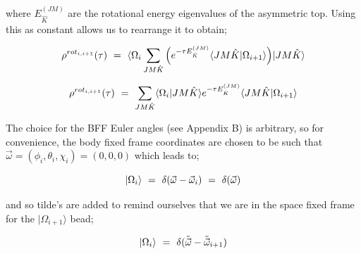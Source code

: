 \documentclass{ece}
\begin{document}
where \begin{math} E_{\hat{K}}^{(JM)} \end{math} are the rotational energy eigenvalues of the asymmetric top. Using this as constant allows us to rearrange it to obtain;

\begin{equation}
    \rho^{rot_{i, i+1}} ( \tau ) \hspace{0.125cm} = \hspace{0.125cm} \langle \Omega_{i} \sum_{J M \hat{K}} \Big( e^{- \tau E_{\hat{K}}^{(JM)}}  \langle JM\hat{K} | \Omega_{i+1} \rangle  \Big) | JM\hat{K} \rangle 
\end{equation}

\begin{equation}
    \rho^{rot_{i, i+1}} ( \tau ) \hspace{0.125cm} = \hspace{0.125cm}  \sum_{J M \hat{K}} \langle \Omega_{i} | JM\hat{K} \rangle  e^{- \tau E_{\hat{K}}^{(JM)}} \langle JM\hat{K} | \Omega_{i+1} \rangle 
\end{equation}

The choice for the \gls{BFF} Euler angles (see Appendix B) is arbitrary, so for convenience, the body fixed frame coordinates are chosen to be such that \begin{math} \vec{\omega} = ( \phi_i , \theta_{i} , \chi_i ) = ( 0 , 0 , 0 ) \end{math} which leads to; 

\begin{equation}
    | \Omega_{i} \rangle \hspace{0.125cm} = \hspace{0.125cm} \delta ( \vec{\omega} - \vec{\omega}_i ) \hspace{0.125cm} = \hspace{0.125cm} \delta ( \vec{\omega} )
\end{equation}

and so tilde's are added to remind ourselves that we are in the space fixed frame for the \begin{math} | \Omega_{i+1} \rangle \end{math} bead;

\begin{equation}
    | \Omega_{i} \rangle \hspace{0.125cm} = \hspace{0.125cm} \delta ( \Tilde{\vec{\omega}} - \Tilde{\vec{\omega}}_{i+1} )  
\end{equation}
\end{document}
